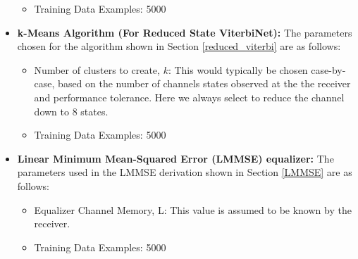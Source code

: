 \begin{itemize}
\begin{itemize}
\item Training Data Examples: 5000
\end{itemize}
\item \textbf{k-Means Algorithm (For Reduced State ViterbiNet):} The parameters chosen for the algorithm shown in  Section \ref{reduced_viterbi} are as follows:
\begin{itemize}
\item Number of clusters to create, $k$: This would typically be chosen case-by-case, based on the number of channels states observed at the the receiver and performance tolerance. Here we always select to reduce the channel down to 8 states.
\item Training Data Examples: 5000
\end{itemize}
\item \textbf{Linear Minimum Mean-Squared Error (LMMSE) equalizer:} The parameters used in the LMMSE derivation shown in Section \ref{LMMSE} are as follows:
\begin{itemize}
\item Equalizer Channel Memory, L: This value is assumed to be known by the receiver. 
\item Training Data Examples: 5000

\end{itemize}

\end{itemize}


